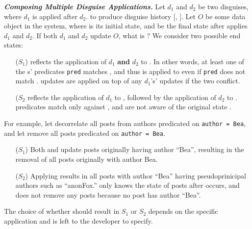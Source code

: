 \vspace{6pt}\noindent\textbf{\emph{Composing Multiple Disguise Applications.}}
Let $d_1$ and $d_2$ be two disguises, where $d_1$ is applied after $d_2$.
to produce disguise history [, ]. 
%
Let $O$ be some data object in the system, where \ostart is its initial state, and
 be the final state after \sys applies $d_1$ and $d_2$.
%
If both $d_1$ and $d_2$ update $O$, what is ?
We consider two possible end states: 
%
\begin{enumerate}
\item[($S_1$)]  reflects the application of $d_1$ \textbf{and} $d_2$ to \ostart. In other
words, at least one of the s' predicates \texttt{pred} matches \ostart, and thus  is
applied to \ohist[\app{d_1}] even if \texttt{pred} does not match \ohist[\app{d_1}]. 
 updates are applied on top of any $d_1$'s' updates if the two conflict.

\item[($S_2$]  reflects the application of $d_1$ to \ostart, followed
by the application of $d_2$ to \ohist{[\app{d_1}]}.  predicates match only against
\ohist{[\app{d_1}]}, and are not aware of the original state \ostart.
\end{enumerate}

\noindent
For example, let  decorrelate all posts from authors predicated
on \texttt{author = Bea}, and let  remove all posts predicated on \texttt{author = Bea}.
%
\begin{enumerate}
\item[($S_1$)] Both  and  update posts originally having author ``Bea'', resulting in the
removal of all posts originally with author Bea.

\item[($S_2$)] Applying  results in all posts with author ``Bea'' having
pseudoprinicipal authors such as ``anonFox.''  only knows the state of posts after
 occurs, and does not remove any posts because no post has author ``Bea''.
\end{enumerate}

The choice of whether  should result in $S_1$ or $S_2$ depends on the
specific application and is left to the developer to specify. 

